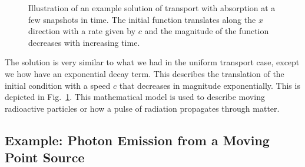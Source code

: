 \begin{figure}[tb!]
\begin{center}
\caption{Illustration of an example solution of transport with absorption at a few snapshots in time. The initial function translates along the $x$ direction with a rate given by $c$ and the magnitude of the function decreases with increasing time.}
\label{Fig:pde_exampleSolutionTransportWithAbsroption}
\end{center}
\end{figure}

The solution is very similar to what we had in the uniform transport case, except we how have an exponential decay term. This describes the translation of the initial condition with a speed $c$ that decreases in magnitude exponentially. This is depicted in Fig.~\ref{Fig:pde_exampleSolutionTransportWithAbsroption}. This mathematical model is used to describe moving radioactive particles or how a pulse of radiation propagates through matter.


\subsection{Example: Photon Emission from a Moving Point Source}

